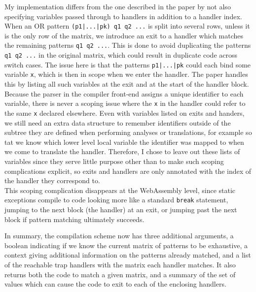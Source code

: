 My implementation differs from the one described in the paper by not also specifying variables passed through to handlers in addition to a handler index. When an OR pattern \verb"(p1|...|pk) q1 q2 ..." is split into several rows, unless it is the only row of the matrix, we introduce an exit to a handler which matches the remaining patterns \verb|q1 q2 ...|. This is done to avoid duplicating the patterns \verb|q1 q2 ...| in the original matrix, which could result in duplicate code across switch cases. The issue here is that the patterns \verb"p1|...|pk" could each bind some variable \verb|x|, which is then in scope when we enter the handler. The paper handles this by listing all such variables at the exit and at the start of the handler block. \\
Because the parser in the compiler front-end assigns a unique identifier to each variable, there is never a scoping issue where the \verb|x| in the handler could refer to the same \verb|x| declared elsewhere. Even with variables listed on exits and handers, we still need an extra data structure to remember identifiers outside of the subtree they are defined when performing analyses or translations, for example so tat we know which lower level local variable the identifier was mapped to when we come to translate the handler. Therefore, I chose to leave out these lists of variables since they serve little purpose other than to make such scoping complications explicit, so exits and handlers are only annotated with the index of the handler they correspond to. \\
This scoping complication disappears at the WebAssembly level, since static exceptions compile to code looking more like a standard \verb|break| statement, jumping to the next block (the handler) at an exit, or jumping past the next block if pattern matching ultimately succeeds.



In summary, the compilation scheme now has three additional arguments, a boolean indicating if we know the current matrix of patterns to be exhaustive, a context giving additional information on the patterns already matched, and a list of the reachable trap handlers with the matrix each handler matches. It also returns both the code to match a given matrix, and a summary of the set of values which can cause the code to exit to each of the enclosing handlers. 





